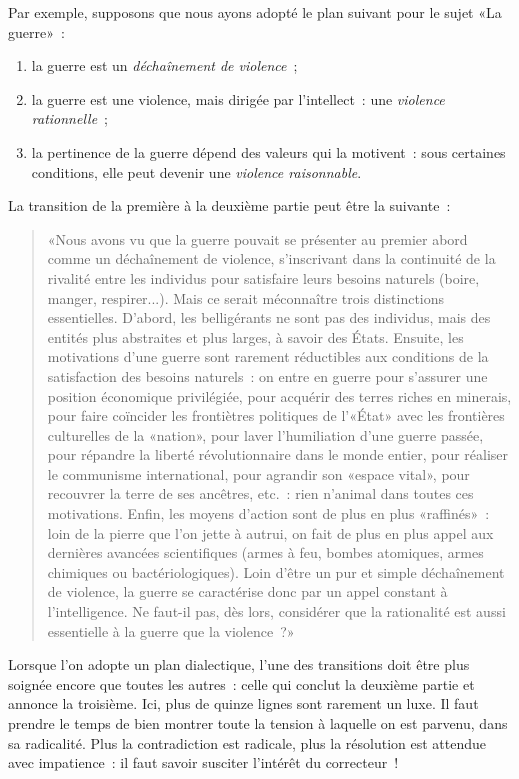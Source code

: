 \documentclass[a4paper,11pt]{article}
\begin{document}
Par exemple, supposons que nous ayons adopté le plan suivant pour le
sujet «La guerre»~:
\begin{enumerate}
\item la guerre est un \emph{déchaînement de violence}~;
\item la guerre est une violence, mais dirigée par l'intellect~: une
  \emph{violence rationnelle}~;
\item la pertinence de la guerre dépend des valeurs qui la motivent~:
  sous certaines conditions, elle peut devenir une \emph{violence
    raisonnable}.
\end{enumerate}
La transition de la première à la deuxième partie peut être la
suivante~:
\begin{quote}
  «Nous avons vu que la guerre pouvait se présenter au premier abord
  comme un déchaînement de violence, s'inscrivant dans la continuité de
  la rivalité entre les individus pour satisfaire leurs besoins naturels
  (boire, manger, respirer...). Mais ce serait méconnaître trois
  distinctions essentielles. D'abord, les belligérants ne sont pas des
  individus, mais des entités plus abstraites et plus larges, à savoir
  des États. Ensuite, les motivations d'une guerre sont rarement
  réductibles aux conditions de la satisfaction des besoins naturels~:
  on entre en guerre pour s'assurer une position économique privilégiée,
  pour acquérir des terres riches en minerais, pour faire coïncider les
  frontiètres politiques de l'«État» avec les frontières culturelles de
  la «nation», pour laver l'humiliation d'une guerre passée, pour
  répandre la liberté révolutionnaire dans le monde entier, pour
  réaliser le communisme international, pour agrandir son «espace
  vital», pour recouvrer la terre de ses ancêtres, etc.~: rien n'animal
  dans toutes ces motivations. Enfin, les moyens d'action sont de plus
  en plus «raffinés»~: loin de la pierre que l'on jette à autrui, on
  fait de plus en plus appel aux dernières avancées scientifiques (armes
  à feu, bombes atomiques, armes chimiques ou bactériologiques). Loin
  d'être un pur et simple déchaînement de violence, la guerre se
  caractérise donc par un appel constant à l'intelligence. Ne faut-il
  pas, dès lors, considérer que la rationalité est aussi essentielle à
  la guerre que la violence~?»
\end{quote}

\par

Lorsque l'on adopte un plan dialectique, l'une des transitions doit être
plus soignée encore que toutes les autres~: celle qui conclut la
deuxième partie et annonce la troisième. Ici, plus de quinze lignes sont
rarement un luxe. Il faut prendre le temps de bien montrer toute la
tension à laquelle on est parvenu, dans sa radicalité. Plus la
contradiction est radicale, plus la résolution est attendue avec
impatience~: il faut savoir susciter l'intérêt du correcteur~!
\end{document}
